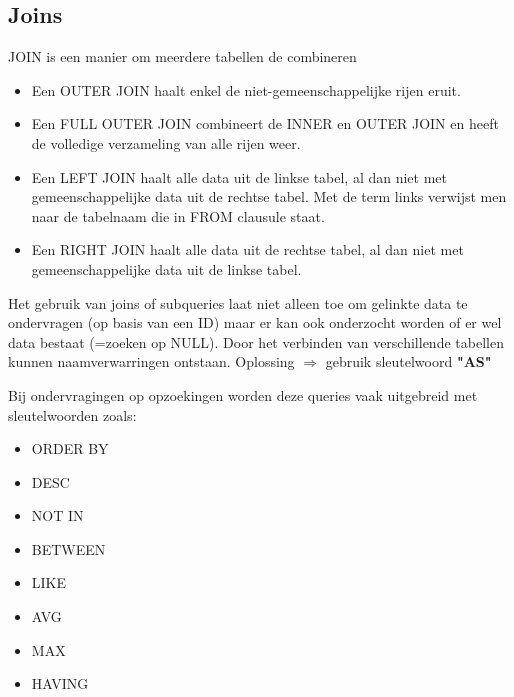 \documentclass{article}
\newcommand{\bold}[1]{\textbf{#1}}
\begin{document}
\subsection{Joins}

JOIN is een manier om meerdere tabellen de combineren



\begin{itemize}
    \item Een OUTER JOIN haalt enkel de niet-gemeenschappelijke rijen eruit.  
    \item Een FULL OUTER JOIN combineert de INNER en OUTER JOIN en heeft de volledige verzameling van alle rijen weer.
    \item Een  LEFT  JOIN  haalt  alle  data  uit  de  linkse  tabel,  al  dan  niet  met  gemeenschappelijke  data  uit  de  rechtse  tabel. Met de term links verwijst men naar de tabelnaam die in FROM clausule staat.
    \item Een RIGHT JOIN haalt alle data uit de rechtse tabel, al dan niet met gemeenschappelijke data uit de linkse tabel.
\end{itemize}

Het gebruik van joins of subqueries laat niet alleen toe om gelinkte data te ondervragen (op basis van een ID) maar er kan ook onderzocht worden of er wel data bestaat (=zoeken op NULL).
Door het verbinden van verschillende tabellen kunnen naamverwarringen ontstaan. Oplossing $\Rightarrow$ gebruik sleutelwoord \bold{"AS"}

Bij ondervragingen op opzoekingen worden deze queries vaak uitgebreid met sleutelwoorden zoals:
\begin{itemize}
    \item ORDER BY
    \item DESC
    \item NOT IN
    \item BETWEEN
    \item LIKE
    \item AVG
    \item MAX
    \item HAVING
\end{itemize}
\end{document}
